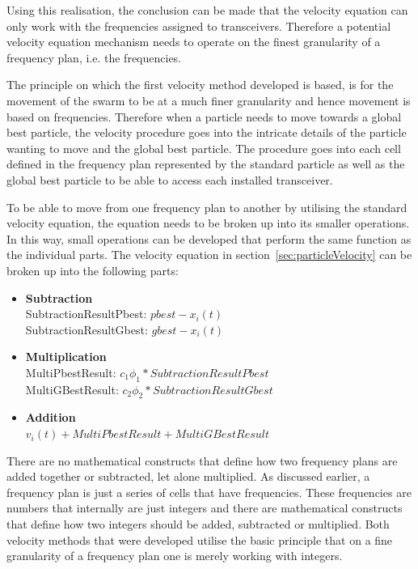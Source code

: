 Using this realisation, the conclusion can be made that the velocity equation can only work with the frequencies assigned to transceivers. Therefore a potential velocity equation mechanism needs to operate on the finest granularity of a frequency plan, i.e. the frequencies.

The principle on which the first velocity method developed is based, is for the movement of the swarm to be at a much finer granularity and hence movement is based on frequencies. Therefore when a particle needs to move towards a global best particle, the velocity procedure goes into the intricate details of the particle wanting to move and the global best particle. The procedure goes into each cell defined in the frequency plan represented by the standard particle as well as the global best particle to be able to access each installed transceiver.

To be able to move from one frequency plan to another by utilising the standard velocity equation, the equation needs to be broken up into its smaller operations. In this way, small operations can be developed that perform the same function as the individual parts. The velocity equation in section~\ref{sec:particleVelocity} can be broken up into the following parts:
\label{lst:velocitybreakup}
\begin{itemize}
\item \textbf{Subtraction} \\SubtractionResultPbest: $pbest - x_i(t)$\\SubtractionResultGbest: $gbest - x_i(t)$
\\
\item \textbf{Multiplication} \\MultiPbestResult: $c_1\phi_1 * SubtractionResultPbest$\\MultiGBestResult: $c_2\phi_2 * SubtractionResultGbest$ 
\item \textbf{Addition}\\$v_i(t) + MultiPbestResult + MultiGBestResult$
\end{itemize}
There are no mathematical constructs that define how two frequency plans are added together or subtracted, let alone multiplied. As discussed earlier, a frequency plan is just a series of cells that have frequencies. These frequencies are numbers that internally are just integers and there are mathematical constructs that define how two integers should be added, subtracted or multiplied. Both velocity methods that were developed utilise the basic principle that on a fine granularity of a frequency plan one is merely working with integers.



